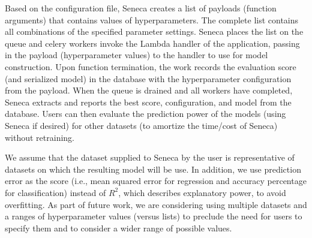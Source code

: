 Based on the configuration file, Seneca creates a list of 
payloads (function arguments) that contains values of 
hyperparameters.  The complete list contains all combinations of the
specified parameter
settings.  Seneca places the list on the queue and celery 
workers invoke the Lambda handler of the application, passing in the
payload (hyperparameter values) to the handler to use for model construction.  
Upon function
termination, the work records the evaluation score (and serialized model)
in the database with the hyperparameter configuration from the payload.
When the queue is drained and all workers have completed, Seneca
extracts and reports the best score, configuration, and model from the database.
Users can then evaluate the prediction power of the models (using Seneca if desired) 
for other datasets (to amortize the time/cost of Seneca) without retraining. 

We assume that the dataset supplied to Seneca by the user
is representative of datasets on which the 
resulting model will be use.  In addition, we use prediction error as the 
score (i.e., mean squared error for regression and accuracy percentage for classification) 
instead of $R^2$, which describes explanatory power, to avoid overfitting.
As part of future work, we are considering using multiple datasets and a ranges
of hyperparameter values (versus lists) to preclude the need for users to specify
them and to consider a wider range of possible values.
